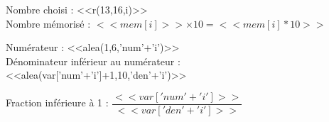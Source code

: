 
Nombre choisi : <<r(13,16,i)>> \\
Nombre mémorisé : $<<mem[i]>>\times10=<<mem[i]*10>>$ \\

\bigskip

Numérateur : <<alea(1,6,'num'+'i')>>\\
Dénominateur inférieur au numérateur : <<alea(var['num'+'i']+1,10,'den'+'i')>>

\bigskip
Fraction inférieure à 1 : $\dfrac{<<var['num'+'i']>>}{<<var['den'+'i']>>}$\\

